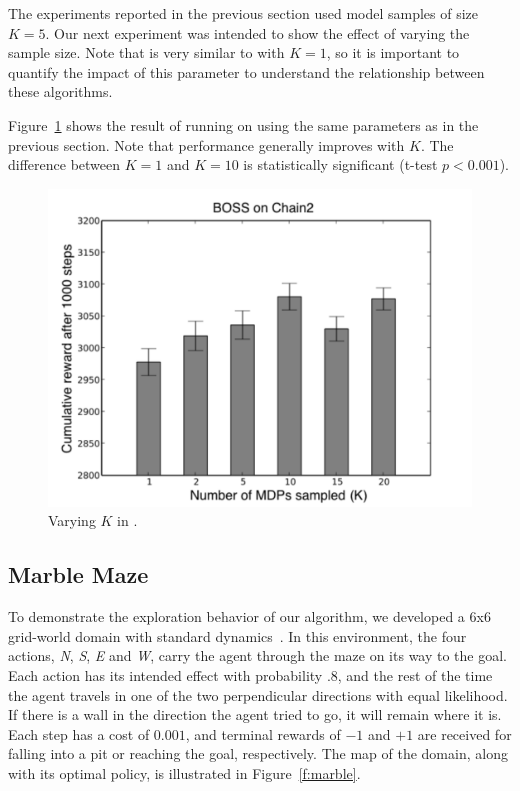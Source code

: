 The experiments reported in the previous section used model samples of
size $K=5$.  Our next experiment was intended to show the effect of varying the
sample size.  Note that  is very similar to  with $K=1$,
so it is important to quantify the impact of this parameter to
understand the relationship between these algorithms.

Figure~\ref{f:varyk} shows the result of running  on  using
the same parameters as in the previous section.  Note that performance
generally improves with $K$.  The difference between $K=1$ and $K=10$ is
statistically significant (t-test $p<0.001$).

\begin{figure}[t]
\begin{center}
\includegraphics[width=1.0\linewidth]{figures/varyk}
\caption{Varying $K$ in .}
\label{f:varyk}
\end{center}
\end{figure}


\subsection{Marble Maze}


To demonstrate the exploration behavior of our algorithm, we developed a
6x6 grid-world domain with standard dynamics~\cite{russell94}.  In this environment, the four actions,
\emph{N}, \emph{S}, \emph{E} and \emph{W}, carry the
agent through the maze on its way to the goal.  Each action has its
intended effect with probability .8, and the rest of the time the
agent travels in one of the two perpendicular directions with
equal likelihood.  If there is a wall in the direction the agent tried
to go, it will remain where it is.  Each step has a cost of $0.001$, and
terminal rewards of $-1$ and $+1$ are received for falling into a pit or
reaching the goal, respectively.  The map of the domain, along with
its optimal policy, is illustrated in Figure~\ref{f:marble}.

